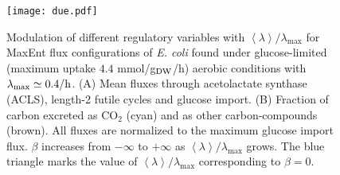 \documentclass[superscriptaddress,amsmath,amssymb,twocolumn]{revtex4-1}
\newcommand{\avg}[1]{\left\langle #1 \right\rangle}
\begin{document}
\begin{figure}
\begin{center}
\texttt{[image: due.pdf]}
\end{center}
\caption{\label{due}Modulation of different regulatory variables with $\avg{\lambda}/\lambda_{\max}$ for MaxEnt flux configurations of {\it E. coli} found under glucose-limited (maximum uptake $4.4$ mmol/g$_{\rm DW}$/h) aerobic conditions with $\lambda_{\max}\simeq 0.4/{\rm h}$. (A) Mean fluxes through acetolactate synthase (ACLS), length-2 futile cycles and glucose import. (B) Fraction of carbon excreted as CO$_2$ (cyan) and as other carbon-compounds (brown). All fluxes are normalized to the maximum glucose import flux. $\beta$ increases from $-\infty$ to $+\infty$ as $\avg{\lambda}/\lambda_{\max}$ grows. The blue triangle marks the value of $\avg{\lambda}/\lambda_{\max}$ corresponding to $\beta=0$.}
\end{figure}
\end{document}
